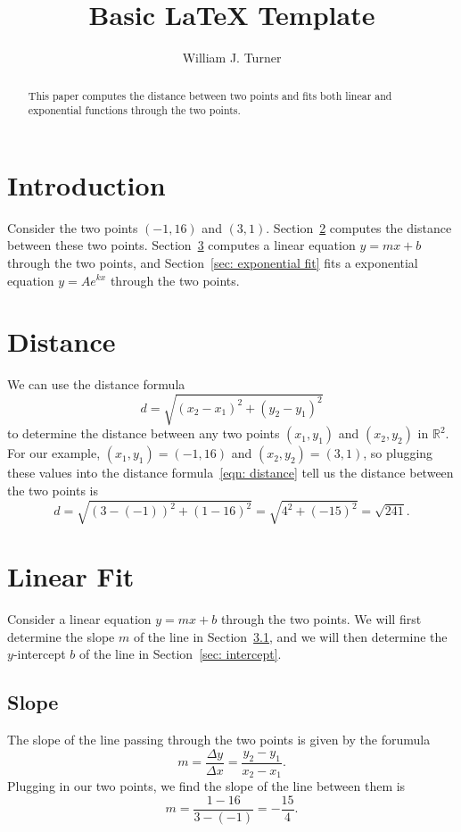\documentclass[10pt]{article}         %
\title{Basic \LaTeX{} Template}
\author{William J. Turner}
\begin{document}
\maketitle

\begin{abstract}
This paper computes the distance between two points and fits both linear and
exponential functions through the two points.
\end{abstract}

\section{Introduction}
Consider the two points $(-1,16)$ and $(3,1)$.  Section~\ref{sec: distance}
computes the distance between these two points.  Section~\ref{sec: linear fit}
computes a linear equation $y = m x + b$ through the two points, and
Section~\ref{sec: exponential fit} fits a exponential equation $y = A e^{k x}$
through the two points.

\section{Distance}
\label{sec: distance}
We can use the distance formula
\begin{equation}
\label{eqn: distance}
	d = \sqrt{(x_2 - x_1)^2 + (y_2 - y_1)^2}
\end{equation}
to determine the distance between any two points $(x_1, y_1)$ and $(x_2, y_2)$
in $\mathbb{R}^2$.  For our example, $(x_1, y_1) = (-1, 16)$ and $(x_2, y_2) =
(3, 1)$, so plugging these values into the distance formula~\eqref{eqn:
distance} tell us the distance between the two points is
$$
	d 
	= \sqrt{(3 - (-1))^2 + (1 - 16)^2}
	= \sqrt{4^2 + (-15)^2}
	= \sqrt{241}
	.
$$

\section{Linear Fit}
\label{sec: linear fit}
Consider a linear equation $y = m x + b$ through the two points.  We will
first determine the slope $m$ of the line in Section~\ref{sec: slope}, and we
will then determine the $y$-intercept $b$ of the line in Section~\ref{sec:
intercept}.

\subsection{Slope}
\label{sec: slope}

The slope of the line passing through the two points is given by the forumula
$$
	m 
	= \frac{\Delta y}{\Delta x} 
	= \frac{y_2 - y_1}{x_2 - x_1}
	.
$$
Plugging in our two points, we find the slope of the line between them is
\begin{equation}
\label{eqn: slope}
	m 
	= \frac{1 - 16}{3 - (-1)}
	= - \frac{15}{4}
	.
\end{equation}
\end{document}
